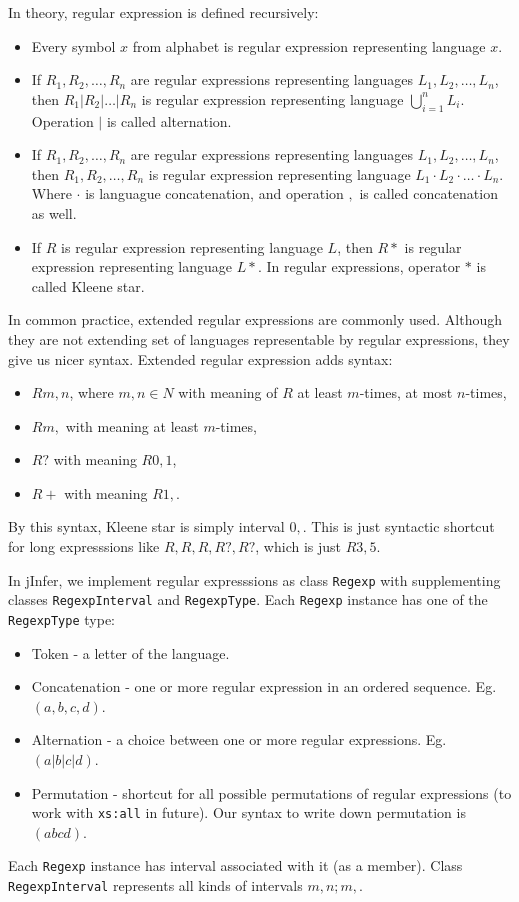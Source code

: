 \documentclass[a4paper,10pt,oneside]{article}
\newcommand{\code}[1]{\texttt{#1}}
\begin{document}
In theory, regular expression is defined recursively:
\begin{itemize}
	\item Every symbol $x$ from alphabet is regular expression representing language ${x}$.
	\item If $R_1, R_2, \dots, R_n$ are regular expressions representing languages $L_1, L_2, \dots, L_n$, then $R_1 | R_2 | \dots | R_n$
	is regular expression representing language $\bigcup_{i = 1}^{n}{L_i}$. Operation $|$ is called alternation.
	\item If $R_1, R_2, \dots, R_n$ are regular expressions representing languages $L_1, L_2, \dots, L_n$, then $R_1, R_2 , \dots , R_n$
	is regular expression representing language $L_1 \cdot L_2 \cdot \ldots \cdot L_n$. Where $\cdot$ is languague concatenation,
	and operation $,$ is called concatenation as well.
	\item If $R$ is regular expression representing language $L$, then $R*$ 
	is regular expression representing language $L*$. In regular expressions, operator $*$ is called Kleene star.
\end{itemize}



In common practice, extended regular expressions are commonly used. Although they are not extending set of
languages representable by regular expressions, they give us nicer syntax. Extended regular expression adds syntax:
\begin{itemize}
	\item $R{m,n}$, where $m,n \in N$ with meaning of $R$ at least $m$-times, at most $n$-times,
	\item $R{m,}$ with meaning at least $m$-times,
	\item $R?$ with meaning $R{0,1}$,
	\item $R+$ with meaning $R{1,}$.
\end{itemize}

By this syntax, Kleene star is simply interval ${0,}$. This is just syntactic shortcut for long expresssions like $R, R, R, R?, R?$, which is just $R{3,5}$.

In jInfer, we implement regular expresssions as class \code{Regexp} with supplementing classes \code{RegexpInterval} and \code{RegexpType}.
Each \code{Regexp} instance has one of the \code{RegexpType} type:
\begin{itemize}
	\item Token - a letter of the language.
	\item Concatenation - one or more regular expression in an ordered sequence. Eg. $(a, b, c, d)$.
	\item Alternation - a choice between one or more regular expressions. Eg. $(a | b | c | d)$.
	\item Permutation - shortcut for all possible permutations of regular expressions (to work with \code{xs:all} in future).
	Our syntax to write down permutation is $(a  b c  d)$.
\end{itemize}

Each \code{Regexp} instance has interval associated with it (as a member). Class \code{RegexpInterval} represents all kinds of intervals
${m,n}; {m,}$. 

\nocite{*}


\end{document}
